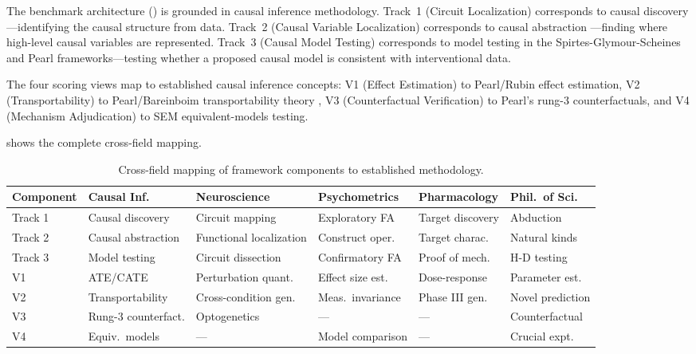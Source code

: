 \documentclass[10pt]{article}
\newcommand{\tighttable}{\setlength{\tabcolsep}{4pt}\renewcommand{\arraystretch}{1.05}}
\begin{document}
The benchmark architecture () is grounded in causal inference methodology. Track~1 (Circuit Localization) corresponds to causal discovery \citep{spirtes2000causation}---identifying the causal structure from data. Track~2 (Causal Variable Localization) corresponds to causal abstraction \citep{geiger2023causal}---finding where high-level causal variables are represented. Track~3 (Causal Model Testing) corresponds to model testing in the Spirtes-Glymour-Scheines and Pearl frameworks---testing whether a proposed causal model is consistent with interventional data.

The four scoring views map to established causal inference concepts: V1 (Effect Estimation) to Pearl/Rubin effect estimation, V2 (Transportability) to Pearl/Bareinboim transportability theory \citep{pearl2011transportability}, V3 (Counterfactual Verification) to Pearl's rung-3 counterfactuals, and V4 (Mechanism Adjudication) to SEM equivalent-models testing.

 shows the complete cross-field mapping.

\begin{table}[t]
\centering
\tighttable
\caption{Cross-field mapping of framework components to established methodology.}
\label{tab:crossfield}
\small
\begin{tabular}{@{}lp{2.2cm}p{2.2cm}p{2.0cm}p{1.8cm}p{2.0cm}@{}}
\toprule
\textbf{Component} & \textbf{Causal Inf.} & \textbf{Neuroscience} & \textbf{Psychometrics} & \textbf{Pharmacology} & \textbf{Phil.\ of Sci.} \\
\midrule
Track 1 & Causal discovery & Circuit mapping & Exploratory FA & Target discovery & Abduction \\
Track 2 & Causal abstraction & Functional localization & Construct oper. & Target charac. & Natural kinds \\
Track 3 & Model testing & Circuit dissection & Confirmatory FA & Proof of mech. & H-D testing \\
V1 & ATE/CATE & Perturbation quant. & Effect size est. & Dose-response & Parameter est. \\
V2 & Transportability & Cross-condition gen. & Meas.\ invariance & Phase III gen. & Novel prediction \\
V3 & Rung-3 counterfact. & Optogenetics & --- & --- & Counterfactual \\
V4 & Equiv.\ models & --- & Model comparison & --- & Crucial expt. \\
\bottomrule
\end{tabular}
\end{table}
\end{document}
